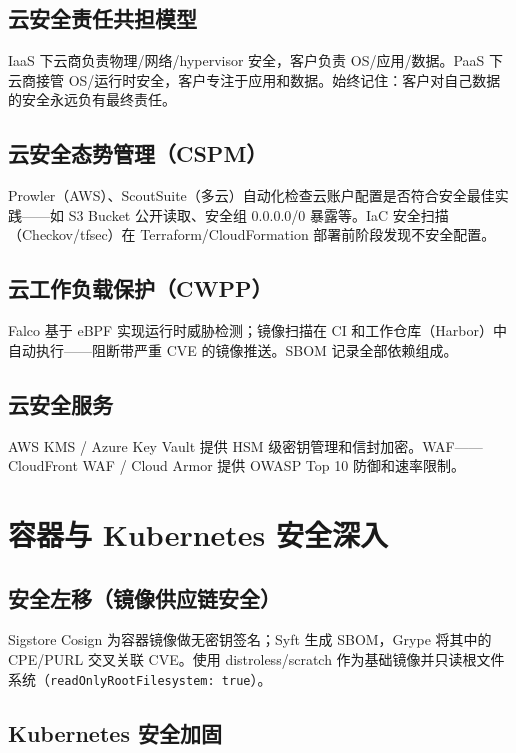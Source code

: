 \documentclass[12pt,UTF8]{ctexbook}
\begin{document}
  \section{云安全责任共担模型}

IaaS 下云商负责物理/网络/hypervisor 安全，客户负责 OS/应用/数据。PaaS 下云商接管 OS/运行时安全，客户专注于应用和数据。始终记住：客户对自己数据的安全永远负有最终责任。

  \section{云安全态势管理（CSPM）}

Prowler（AWS）、ScoutSuite（多云）自动化检查云账户配置是否符合安全最佳实践——如 S3 Bucket 公开读取、安全组 0.0.0.0/0 暴露等。IaC 安全扫描（Checkov/tfsec）在 Terraform/CloudFormation 部署前阶段发现不安全配置。

  \section{云工作负载保护（CWPP）}

Falco 基于 eBPF 实现运行时威胁检测；镜像扫描在 CI 和工作仓库（Harbor）中自动执行——阻断带严重 CVE 的镜像推送。SBOM 记录全部依赖组成。

  \section{云安全服务}

AWS KMS / Azure Key Vault 提供 HSM 级密钥管理和信封加密。WAF——CloudFront WAF / Cloud Armor 提供 OWASP Top 10 防御和速率限制。


\chapter{容器与 Kubernetes 安全深入}
\label{chap:container-security-deep}

  \section{安全左移（镜像供应链安全）}

Sigstore Cosign 为容器镜像做无密钥签名；Syft 生成 SBOM，Grype 将其中的 CPE/PURL 交叉关联 CVE。使用 distroless/scratch 作为基础镜像并只读根文件系统（\verb|readOnlyRootFilesystem: true|）。

  \section{Kubernetes 安全加固}
\end{document}
